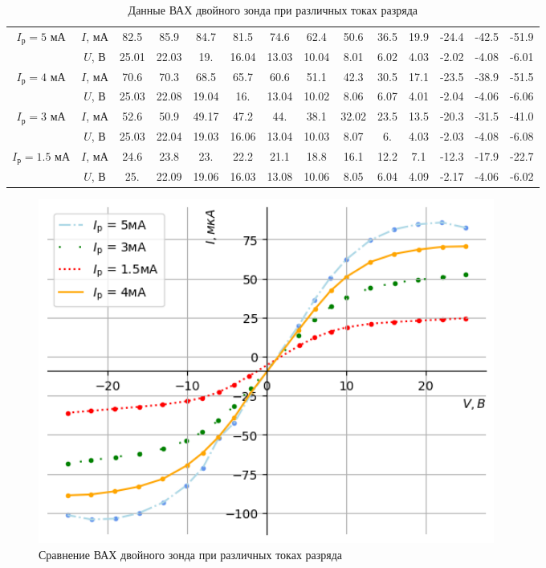 \newpage
\begin{table}[h!]
    \centering
    \begin{tabular}{|c|c|c|c|c|c|c|c|c|c|c|c|c|c|}
        \hline
        \multirow{2}{*}{$I_{\text{р}} = 5$ мА} & $I$, мА & 82.5&85.9&84.7&81.5&74.6&62.4&50.6&36.5&19.9&-24.4&-42.5&-51.9\\
        &$U$, В & 25.01&  22.03&  19.  &  16.04&  13.03&  10.04&   8.01&   6.02& 4.03&  -2.02&  -4.08&  -6.01\\\hline
        \multirow{2}{*}{$I_{\text{р}} = 4$ мА} & $I$, мА & 70.6&  70.3&  68.5&  65.7&  60.6&  51.1&  42.3&  30.5&  17.1&
       -23.5& -38.9& -51.5\\
       &$U$, В & 25.03& 22.08& 19.04& 16.  & 13.04& 10.02&  8.06&  6.07&  4.01&
       -2.04& -4.06& -6.06\\\hline
       \multirow{2}{*}{$I_{\text{р}} = 3$ мА} & $I$, мА & 52.6 &  50.9 &  49.17&  47.2 &  44.  &  38.1 &  32.02&  23.5 &
        13.5 & -20.3 & -31.5 & -41.0\\
       &$U$, В & 25.03& 22.04& 19.03& 16.06& 13.04& 10.03&  8.07&  6.  &  4.03&
       -2.03& -4.08& -6.08\\\hline
       \multirow{2}{*}{$I_{\text{р}} = 1.5$ мА} & $I$, мА & 24.6&  23.8&  23. &  22.2&  21.1&  18.8&  16.1&  12.2&   7.1&
       -12.3& -17.9& -22.7\\
       &$U$, В & 25.  & 22.09& 19.06& 16.03& 13.08& 10.06&  8.05&  6.04&  4.09&
       -2.17& -4.06& -6.02\\\hline
    \end{tabular}
    \caption{Данные ВАХ двойного зонда при различных токах разряда}
\end{table}
\begin{figure}[h!]
    \centering
    \includegraphics[width=15cm]{images/plot2.png}
    \caption{Сравнение ВАХ двойного зонда при различных токах разряда}
\end{figure}

